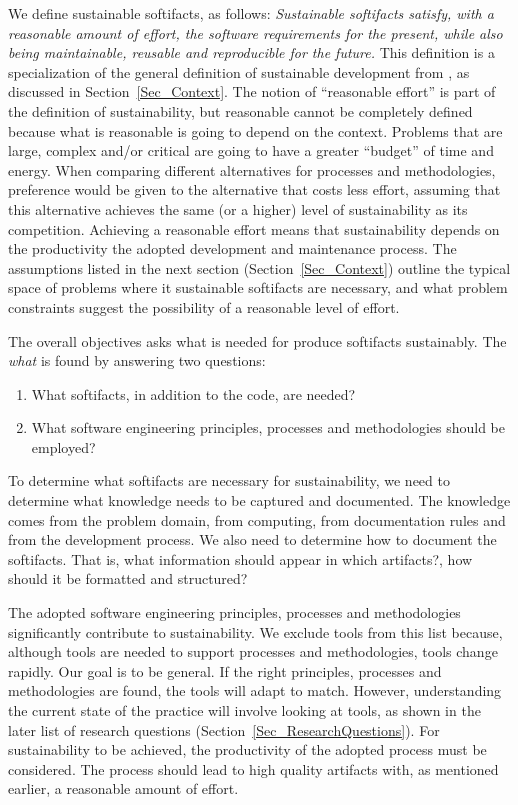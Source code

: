 \documentclass[12pt]{article}
\begin{document}
We define sustainable softifacts, as follows: \emph{Sustainable softifacts
  satisfy, with a reasonable amount of effort, the software requirements for the
  present, while also being maintainable, reusable and reproducible for the
  future.}  This definition is a specialization of the general definition of
sustainable development from \citet{Brundtland1987}, as discussed in
Section~\ref{Sec_Context}.  The notion of ``reasonable effort'' is part of the
definition of sustainability, but reasonable cannot be completely defined
because what is reasonable is going to depend on the context.  Problems that are
large, complex and/or critical are going to have a greater ``budget'' of time
and energy.  When comparing different alternatives for processes and
methodologies, preference would be given to the alternative that costs less
effort, assuming that this alternative achieves the same (or a higher) level of
sustainability as its competition.  Achieving a reasonable effort means that
sustainability depends on the productivity the adopted development and
maintenance process.  The assumptions listed in the next section
(Section~\ref{Sec_Context}) outline the typical space of problems where it
sustainable softifacts are necessary, and what problem constraints suggest the
possibility of a reasonable level of effort.

The overall objectives asks what is needed for produce softifacts sustainably.
The \emph{what} is found by answering two questions:

\begin{enumerate}
\item What softifacts, in addition to the code, are needed?
\item What software engineering principles, processes and methodologies should
  be employed?
\end{enumerate}

To determine what softifacts are necessary for sustainability, we need to
determine what knowledge needs to be captured and documented.  The knowledge
comes from the problem domain, from computing, from documentation rules and from
the development process.  We also need to determine how to document the
softifacts.  That is, what information should appear in which artifacts?, how
should it be formatted and structured?

The adopted software engineering principles, processes and methodologies
significantly contribute to sustainability.  We exclude tools from this list
because, although tools are needed to support processes and methodologies, tools
change rapidly.  Our goal is to be general.  If the right principles, processes
and methodologies are found, the tools will adapt to match.  However,
understanding the current state of the practice will involve looking at tools,
as shown in the later list of research questions
(Section~\ref{Sec_ResearchQuestions}).  For sustainability to be achieved, the
productivity of the adopted process must be considered.  The process should lead
to high quality artifacts with, as mentioned earlier, a reasonable amount of
effort.
\end{document}
